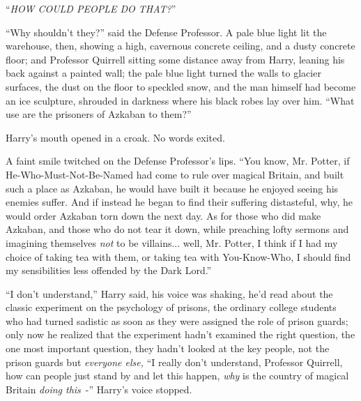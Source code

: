 ``\emph{HOW COULD PEOPLE DO THAT?}''

``Why shouldn't they?'' said the Defense Professor. A pale blue light lit the warehouse, then, showing a high, cavernous concrete ceiling, and a dusty concrete floor; and Professor Quirrell sitting some distance away from Harry, leaning his back against a painted wall; the pale blue light turned the walls to glacier surfaces, the dust on the floor to speckled snow, and the man himself had become an ice sculpture, shrouded in darkness where his black robes lay over him. ``What use are the prisoners of Azkaban to them?''

Harry's mouth opened in a croak. No words exited.

A faint smile twitched on the Defense Professor's lips. ``You know, Mr. Potter, if He-Who-Must-Not-Be-Named had come to rule over magical Britain, and built such a place as Azkaban, he would have built it because he enjoyed seeing his enemies suffer. And if instead he began to find their suffering distasteful, why, he would order Azkaban torn down the next day. As for those who did make Azkaban, and those who do not tear it down, while preaching lofty sermons and imagining themselves \emph{not} to be villains... well, Mr. Potter, I think if I had my choice of taking tea with them, or taking tea with You-Know-Who, I should find my sensibilities less offended by the Dark Lord.''

``I don't understand,'' Harry said, his voice was shaking, he'd read about the classic experiment on the psychology of prisons, the ordinary college students who had turned sadistic as soon as they were assigned the role of prison guards; only now he realized that the experiment hadn't examined the right question, the one most important question, they hadn't looked at the key people, not the prison guards but \emph{everyone else,} ``I really don't understand, Professor Quirrell, how can people just stand by and let this happen, \emph{why} is the country of magical Britain \emph{doing this}~-'' Harry's voice stopped.

